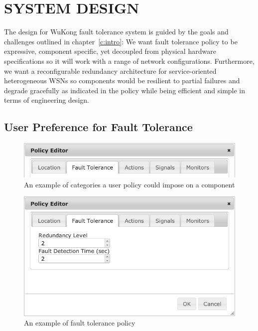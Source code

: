 \cleardoublepage
\singlespacing
\chapter{SYSTEM DESIGN}
\label{c:design}
\doublespacing\nointerlineskip

The design for WuKong fault tolerance system is guided by the goals and
challenges outlined in chapter~\ref{c:intro}: We want fault tolerance
policy to be expressive, component specific, yet decoupled from physical
hardware specifications so it will work with a range of network configurations.
Furthermore, we want a reconfigurable redundancy architecture for
service-oriented heterogeneous WSNs so components would be resilient to partial
failures and degrade gracefully as indicated in the policy while being efficient
and simple in terms of engineering design.

\section{User Preference for Fault Tolerance}

\begin{figure}[h!]
\centering
    \includegraphics[width=\linewidth]{figures/fbp-policy}
\caption{An example of categories a user policy could impose on a component}
\label{fig:fbp-policy}
\end{figure}

\begin{figure}[h!]
\centering
    \includegraphics[width=\linewidth]{figures/fbp-ft-policy}
\caption{An example of fault tolerance policy}
\label{fig:fbp-ft-policy}
\end{figure}

